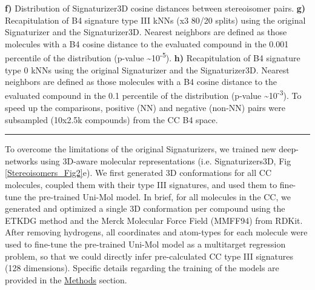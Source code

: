 \begin{Figure_modified}
{     \textbf{f)} Distribution of Signaturizer3D cosine distances between stereoisomer pairs.
     \textbf{g)} Recapitulation of B4 signature type III kNNs (x3 80/20 splits) using the original Signaturizer and the Signaturizer3D. Nearest neighbors are defined as those molecules with a B4 cosine distance to the evaluated compound in the 0.001 percentile of the distribution (p-value \textasciitilde10\textsuperscript{-5}).
     \textbf{h)} Recapitulation of B4 signature type 0 kNNs using the original Signaturizer and the Signaturizer3D. Nearest neighbors are defined as those molecules with a B4 cosine distance to the evaluated compound in the 0.1 percentile of the distribution (p-value \textasciitilde10\textsuperscript{-3}). To speed up the comparisons, positive (NN) and negative (non-NN) pairs were subsampled (10x2.5k compounds) from the CC B4 space.
  }
  \vspace{-5mm}
  \rule[0ex]{\textwidth}{0.5pt}
  \vspace{-9mm}
  \label{Stereoisomers_Fig2}
\end{Figure_modified}

To overcome the limitations of the original Signaturizers, we trained new deep-networks using 3D-aware molecular representations (i.e. Signaturizers3D, Fig \ref{Stereoisomers_Fig2}e). We first generated 3D conformations for all CC molecules, coupled them with their type III signatures, and used them to fine-tune the pre-trained Uni-Mol model\cite{zhou_uni-mol_2023}. In brief, for all molecules in the CC, we generated and optimized a single 3D conformation per compound using the ETKDG method\cite{riniker_better_2015} and the Merck Molecular Force Field (MMFF94) from RDKit. After removing hydrogens, all coordinates and atom-types for each molecule were used to fine-tune the pre-trained Uni-Mol model as a multitarget regression problem, so that we could directly infer pre-calculated CC type III signatures (128 dimensions). Specific details regarding the training of the models are provided in the \hyperref[Stereoisomers_Methods]{Methods} section. 

